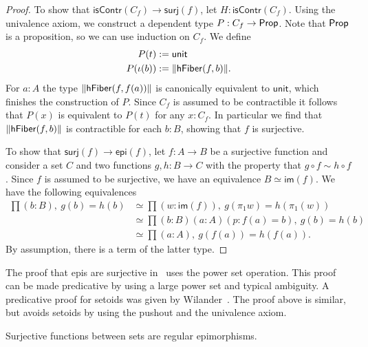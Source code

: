 \begin{proof}
To show that $\mathsf{isContr}(C_f)\to\mathsf{surj}(f)$,
let $H:\mathsf{isContr}(C_f)$. Using the univalence axiom, we construct
a dependent type $P:C_f\to\mathsf{Prop}$. Note that $\mathsf{Prop}$ is
a proposition, so we can use induction on $C_f$. We define
\begin{align*}
P(t) & := \mathsf{unit}\\
P(\iota(b)) & := \|\mathsf{hFiber}(f,b)\|.
\end{align*}
For $a:A$ the type $\|\mathsf{hFiber}(f,f(a))\|$ is canonically
equivalent to $\mathsf{unit}$, which finishes the construction of $P$.
Since $C_f$ is assumed to be contractible it follows that $P(x)$ is
equivalent to $P(t)$ for any $x:C_f$. In particular we find that
$\|\mathsf{hFiber}(f,b)\|$ is contractible for each $b:B$, showing
that $f$ is surjective.

To show that $\mathsf{surj}(f)\to\mathsf{epi}(f)$,
let $f:A\to B$ be a surjective function and consider a set $C$ and two functions
$g,h:B\to C$ with the property that $g\circ f\sim h\circ f$. Since $f$ 
is assumed to be surjective,
we have an equivalence $B\simeq\mathsf{im}(f)$. We have the following equivalences
\begin{align*}
\prod(b:B),\ g(b)= h(b) 
& \simeq \prod(w:\mathsf{im}(f)),\ g(\pi_1 w)= h(\pi_1(w))\\
& \simeq \prod(b:B)(a:A)(p:f(a)= b),\ g(b)= h(b)\\
& \simeq \prod(a:A),\ g(f(a))= h(f(a)).
\end{align*}
By assumption, there is a term of the latter type.
\end{proof}
The proof that epis are surjective in~\cite{Mines/R/R:1988} uses the power set operation. 
This proof can be made predicative by using a large power set and typical ambiguity.
A predicative proof for setoids was given by Wilander~\cite{Wilander2010}. 
The proof above is similar, but avoids setoids by using the pushout and the
univalence axiom. 

\begin{lem}\label{lem:images_are_coequalizers}
Surjective functions between sets are regular epimorphisms.
\end{lem}


